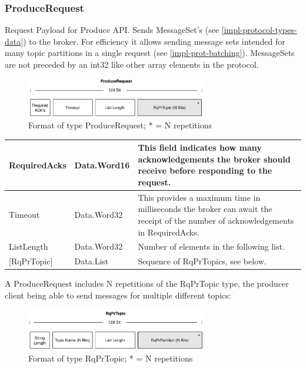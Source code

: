 \subsubsection{ProduceRequest}
\label{subsec:protocol-types-producerequest}

Request Payload for Produce API. Sends MessageSet's (see 
\ref{impl-protocol-types-data}) to the broker. For efficiency it allows sending
message sets intended for many topic partitions in a single request (see
\ref{impl-prot-batching}). MessageSets are not preceded by an int32 like other
array elements in the protocol.

\begin{figure}[H]
    \centering
    \includegraphics[width=0.7\textwidth]{images/impl-prot-types-produceRequest.png}
    \caption{Format of type ProduceRequest; * = N repetitions }
    \label{fig:impl-prot-types-produceRequest}
\end{figure}

\begin{table}[H]
\centering
\begin{tabular}{ l  l  p{10cm} }
\hline
RequiredAcks  & Data.Word16 & This field indicates how many acknowledgements the broker should receive before responding to the request.                       \\ \hline
Timeout       & Data.Word32 & This provides a maximum time in milliseconds the broker can await the receipt of the number of acknowledgements in RequiredAcks. \\ \hline
ListLength    & Data.Word32 & Number of elements in the following list.                                                                                             \\ \hline
{[}RqPrTopic{]} & Data.List   & Sequence of RqPrTopics, see below.                                                                                                  \\ \hline
\end{tabular}
\end{table}

A ProduceRequest includes N repetitions of the RqPrTopic type, the producer
client being able to send messages for multiple different topics:

\begin{figure}[H]
    \centering
    \includegraphics[width=0.7\textwidth]{images/impl-prot-types-prTopic.png}
    \caption{Format of type RqPrTopic; * = N repetitions }
    \label{fig:impl-prot-types-produceRequest}
\end{figure}

